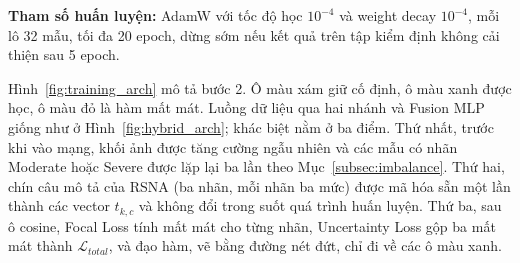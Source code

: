 \textbf{Tham số huấn luyện:} AdamW với tốc độ học $10^{-4}$ và weight decay $10^{-4}$, mỗi lô 32 mẫu, tối đa 20 epoch, dừng sớm nếu kết quả trên tập kiểm định không cải thiện sau 5 epoch.


Hình~\ref{fig:training_arch} mô tả bước 2. Ô màu xám giữ cố định, ô màu xanh được học, ô màu đỏ là hàm mất mát. Luồng dữ liệu qua hai nhánh và Fusion MLP giống như ở Hình~\ref{fig:hybrid_arch}; khác biệt nằm ở ba điểm. Thứ nhất, trước khi vào mạng, khối ảnh được tăng cường ngẫu nhiên và các mẫu có nhãn Moderate hoặc Severe được lặp lại ba lần theo Mục~\ref{subsec:imbalance}. Thứ hai, chín câu mô tả của RSNA (ba nhãn, mỗi nhãn ba mức) được mã hóa sẵn một lần thành các vector $t_{k,c}$ và không đổi trong suốt quá trình huấn luyện. Thứ ba, sau ô cosine, Focal Loss tính mất mát cho từng nhãn, Uncertainty Loss gộp ba mất mát thành $\mathcal{L}_{total}$, và đạo hàm, vẽ bằng đường nét đứt, chỉ đi về các ô màu xanh.

